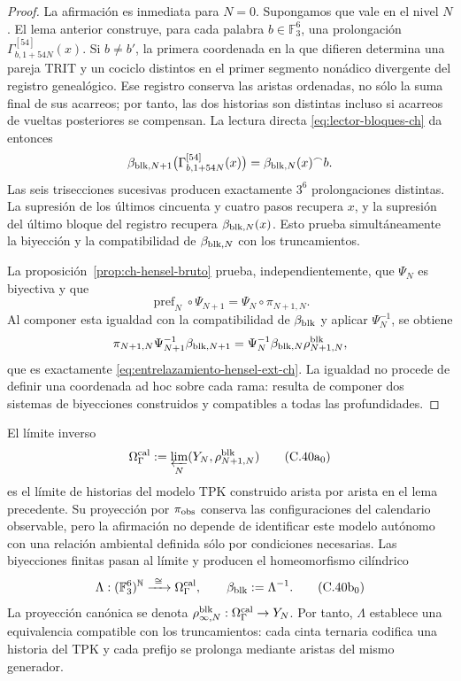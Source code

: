 \begin{proof}
La afirmación es inmediata para \(N=0\). Supongamos que vale en el nivel
\(N\). El lema anterior construye, para cada palabra
\(b\in\mathbb F_3^6\), una prolongación
    \(\Gamma_{b,1+54N}^{[54]}(x)\). Si \(b\ne b'\), la primera coordenada en la
que difieren determina una pareja TRIT y un cociclo distintos en el primer
segmento nonádico divergente del registro genealógico. Ese registro conserva
las aristas ordenadas, no sólo la suma final de sus acarreos; por tanto, las dos
historias son distintas incluso si acarreos de vueltas posteriores se
compensan. La lectura directa \eqref{eq:lector-bloques-ch} da entonces
\begin{equation}
 \beta_{{\rm blk},N+1}
 \bigl(\Gamma_{b,1+54N}^{[54]}(x)\bigr)
 =\beta_{{\rm blk},N}(x)^\frown b.
 \label{eq:beta-concatenacion-demostrada-ch}
\end{equation}
Las seis trisecciones sucesivas producen exactamente \(3^6\) prolongaciones
distintas. La supresión de los últimos cincuenta y cuatro pasos recupera
\(x\), y la supresión del último bloque del registro recupera
\(\beta_{{\rm blk},N}(x)\). Esto prueba simultáneamente la biyección y la
compatibilidad de \(\beta_{{\rm blk},N}\) con los truncamientos.

La proposición~\ref{prop:ch-hensel-bruto} prueba, independientemente, que
\(\Psi_N\) es biyectiva y que
\[
 \operatorname{pref}_N\circ\Psi_{N+1}
 =\Psi_N\circ\pi_{N+1,N}.
\]
Al componer esta igualdad con la compatibilidad de \(\beta_{\rm blk}\) y
aplicar \(\Psi_N^{-1}\), se obtiene
\[
 \pi_{N+1,N}\Psi_{N+1}^{-1}\beta_{{\rm blk},N+1}
 =\Psi_N^{-1}\beta_{{\rm blk},N}\rho^{\rm blk}_{N+1,N},
\]
que es exactamente \eqref{eq:entrelazamiento-hensel-ext-ch}. La igualdad no
procede de definir una coordenada ad hoc sobre cada rama: resulta de componer
dos sistemas de biyecciones construidos y compatibles a todas las
profundidades.
\end{proof}

El límite inverso
\[
 \Omega_\Gamma^{\rm cal}:=
 \varprojlim_N(Y_N,\rho^{\rm blk}_{N+1,N})
\tag{C.40a$_0$}
\label{eq:omega-gamma-catalogal-ch}
\]
es el límite de historias del modelo TPK construido arista por
arista en el lema precedente. Su proyección por \(\pi_{\rm obs}\) conserva
las configuraciones del calendario observable, pero la afirmación no depende
de identificar este modelo autónomo con una relación ambiental definida sólo
por condiciones necesarias. Las biyecciones finitas pasan
al límite y producen el homeomorfismo cilíndrico
\[
 \Lambda:(\mathbb F_3^6)^{\mathbb N}
 \xrightarrow{\ \cong\ }\Omega_\Gamma^{\rm cal},
 \qquad
 \beta_{\rm blk}:=\Lambda^{-1}.
\tag{C.40b$_0$}
\label{eq:homeomorfismo-calibrado-ch}
\]
La proyección canónica se denota
\(\rho^{\rm blk}_{\infty,N}:\Omega_\Gamma^{\rm cal}\to Y_N\).
Por tanto, \(\Lambda\) establece una equivalencia compatible con los
truncamientos: cada cinta ternaria codifica una historia del TPK y cada
prefijo se prolonga mediante aristas del mismo generador.


